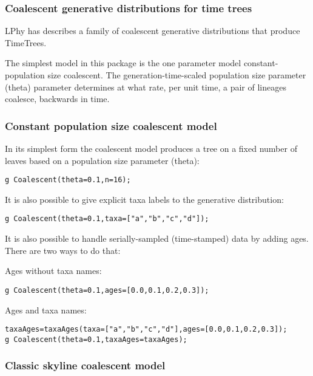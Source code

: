 \documentclass[10pt,letterpaper,table]{article}
\begin{document}
{\subsubsection*{Coalescent generative distributions for time trees}

LPhy has describes a family of coalescent generative distributions
that produce TimeTrees.

The simplest model in this package is the one parameter model
constant-population size coalescent.
The generation-time-scaled population size parameter (theta) parameter determines at
what rate, per unit time, a pair of lineages coalesce, backwards in time.

\subsubsection*{Constant population size coalescent model}

In its simplest form \cite{kingman81} the coalescent model produces a
tree on a fixed number of leaves based on a population size parameter (theta):

\begin{alltt}
  g ~ Coalescent(theta=0.1, n=16);
\end{alltt}

It is also possible to give explicit taxa labels to the generative
distribution:

\begin{alltt}
  g ~ Coalescent(theta=0.1, taxa=["a", "b", "c", "d"]);
\end{alltt}

It is also possible to handle serially-sampled (time-stamped) data by
adding ages.
There are two ways to do that:

Ages without taxa names:

\begin{alltt}
  g ~ Coalescent(theta=0.1, ages=[0.0, 0.1, 0.2, 0.3]);
\end{alltt}

Ages and taxa names:

\begin{alltt}
  taxaAges = taxaAges(taxa=["a", "b", "c", "d"], ages=[0.0, 0.1, 0.2, 0.3]);
  g ~ Coalescent(theta=0.1, taxaAges=taxaAges);
\end{alltt}

\subsubsection*{Classic skyline coalescent model}

}
\end{document}
